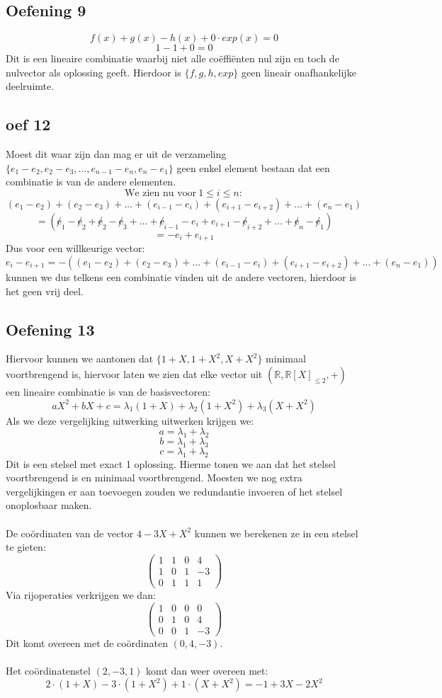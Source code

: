 \documentclass[lineaire_algebra_oplossingen.tex]{subfiles}
\begin{document}
\subsection{Oefening 9}
$$f(x)+g(x)-h(x)+0\cdot exp(x) = 0$$
$$1 - 1 + 0 = 0$$
Dit is een lineaire combinatie waarbij niet alle co\"effi\"enten nul zijn en toch de nulvector als oplossing geeft. Hierdoor is
$\{f,g,h,exp\}$ geen lineair onafhankelijke deelruimte.
\subsection*{oef 12}
Moest dit waar zijn dan mag er uit de verzameling $\{ e_1-e_2,e_2-e_3,\dots ,e_{n-1}-e_n,e_n-e_1\}$ geen enkel element bestaan dat een combinatie is van de andere elementen.
$$
\text{We zien nu voor}\ 1 \leq i \leq n:
$$
$$ 
(e_1-e_2)+(e_2-e_3)+\dots +(e_{i-1}-e_i)+(e_{i+1}-e_{i+2})+\dots + (e_n - e_1)
$$
$$
= (\not e_1-\not e_2+\not e_2-\not e_3+\dots +\not e_{i-1}-e_i+e_{i+1}-\not e_{i+2}+\dots + \not e_n - \not e_1)
$$
$$
= -e_i + e_{i+1}
$$
Dus voor een willkeurige vector:
$$
e_i - e_{i+1} = -\left((e_1-e_2)+(e_2-e_3)+\dots +(e_{i-1}-e_i)+(e_{i+1}-e_{i+2})+\dots + (e_n - e_1)\right)
$$
kunnen we dus telkens een combinatie vinden uit de andere vectoren, hierdoor is het geen vrij deel. 
\subsection{Oefening 13}
Hiervoor kunnen we aantonen dat $\{1+X,1+X^2,X+X^2\}$ minimaal voortbrengend is, hiervoor laten we zien dat elke vector uit  $(\mathbb{R},\mathbb{R}[X]_{\leq 2},+)$ een lineaire combinatie is van de basisvectoren:
$$aX^2 + bX + c = \lambda_{1} (1+X) + \lambda_{2} (1+X^2) + \lambda_{3} (X+X^2)$$
Als we deze vergelijking uitwerking uitwerken krijgen we:
$$a = \lambda_{1} + \lambda_2$$
$$b = \lambda_1 + \lambda_3$$
$$c = \lambda_1 + \lambda_2$$
Dit is een stelsel met exact 1 oplossing. Hierme tonen we aan dat het stelsel voortbrengend is en minimaal voortbrengend. Moesten we nog extra vergelijkingen er aan toevoegen zouden we redundantie invoeren of het stelsel onoplosbaar maken.
\\
\\
De co\"ordinaten van de vector $4 -3X + X^2$ kunnen we berekenen ze in een stelsel te gieten:
$$
\begin{pmatrix}
1&1&0&4\\
1&0&1&-3\\
0&1&1&1
\end{pmatrix}
$$
Via rijoperaties verkrijgen we dan:
$$
\begin{pmatrix}
1&0&0&0\\
0&1&0&4\\
0&0&1&-3
\end{pmatrix}
$$
Dit komt overeen met de co\"ordinaten $(0,4,-3)$.
\\
\\
Het co\"ordinatenstel $(2,-3,1)$ komt dan weer overeen met:
$$
2\cdot (1+X) -3 \cdot (1+X^2)+ 1\cdot (X+X^2)= -1 +3X-2X^2
$$
\end{document}
